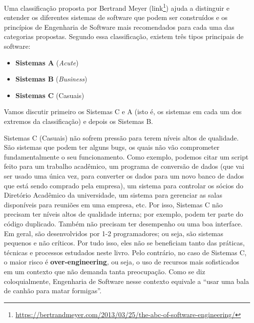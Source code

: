 \documentclass[
  11pt,
  twoside]{book}
\DeclareRobustCommand{\href}[2]{#2\footnote{\url{#1}}}
\begin{document}
 Uma classificação proposta por Bertrand Meyer
(\href{https://bertrandmeyer.com/2013/03/25/the-abc-of-software-engineering/}{link})
ajuda a distinguir e entender os diferentes sistemas de software que
podem ser construídos e os princípios de Engenharia de Software mais
recomendados para cada uma das categorias propostas. Segundo essa
classificação, existem três tipos principais de software:

\begin{itemize}
\item
  \textbf{Sistemas A} (\emph{Acute})
\item
  \textbf{Sistemas B} (\emph{Business})
\item
  \textbf{Sistemas C} (Casuais)
\end{itemize}

Vamos discutir primeiro os Sistemas C e A (isto é, os sistemas em cada
um dos extremos da classificação) e depois os Sistemas B.

  Sistemas C (Casuais)
não sofrem pressão para terem níveis altos de qualidade. São sistemas
que podem ter alguns bugs, os quais não vão comprometer fundamentalmente
o seu funcionamento. Como exemplo, podemos citar um script feito para um
trabalho acadêmico, um programa de conversão de dados (que vai ser usado
uma única vez, para converter os dados para um novo banco de dados que
está sendo comprado pela empresa), um sistema para controlar os sócios
do Diretório Acadêmico da universidade, um sistema para gerenciar as
salas disponíveis para reuniões em uma empresa, etc. Por isso, Sistemas
C não precisam ter níveis altos de qualidade interna; por exemplo, podem
ter parte do código duplicado. Também não precisam ter desempenho ou uma
boa interface. Em geral, são desenvolvidos por 1-2 programadores; ou
seja, são sistemas pequenos e não críticos. Por tudo isso, eles não se
beneficiam tanto das práticas, técnicas e processos estudados neste
livro. Pelo contrário, no caso de Sistemas C, o maior risco é
\textbf{over-engineering}\emph{,} ou seja\emph{,} o uso de recursos mais
sofisticados em um contexto que não demanda tanta preocupação. Como se
diz coloquialmente, Engenharia de Software nesse contexto equivale a
``usar uma bala de canhão para matar formigas''.
\end{document}
